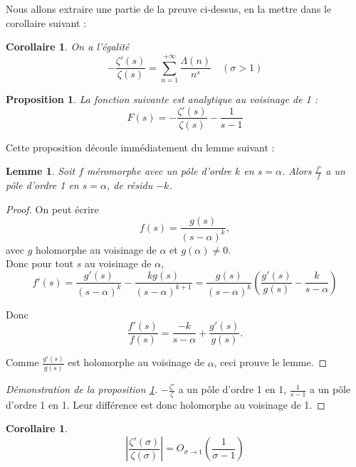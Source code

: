 \documentclass[french]{report}
\newtheorem{proposition}[theorem]{Proposition}
\newtheorem{corollary}[theorem]{Corollaire}
\newtheorem{lemma}[theorem]{Lemme}
\begin{document}
Nous allons extraire une partie de la preuve ci-dessus, en la mettre dans le corollaire suivant :

\begin{corollary}\label{cor:zeta-zeta-prime-van-mangoldt}
  On a l'égalité
  \[ -\frac{\zeta'(s)}{\zeta(s)} = \sum_{n=1}^{+\infty}\frac{\Lambda(n)}{n^s}\quad(\sigma>1) \]
\end{corollary}

\begin{proposition}\label{prop:zeta-sur-zeta-prime-1-sur-holomorphe}
  La fonction suivante est analytique au voisinage de 1 :
  \[ F(s) = - \frac{\zeta'(s)}{\zeta(s)} - \frac{1}{s-1} \]
\end{proposition}

Cette proposition découle immédiatement du lemme suivant :

\begin{lemma}
  Soit $f$ méromorphe avec un pôle d'ordre $k$ en $s=\alpha$. Alors $\frac{f'}{f}$ a un pôle d'ordre 1 en $s=\alpha$, de résidu $-k$.
\end{lemma}

\begin{proof}
  On peut écrire
  \[ f(s) = \frac{g(s)}{(s-\alpha)^k},\]
  avec $g$ holomorphe au voisinage de $\alpha$ et $g(\alpha)\neq0$.
  \\

  Donc pour tout $s$ au voisinage de $\alpha$,
  \[
    f'(s)
    = \frac{g'(s)}{(s-\alpha)^k}-\frac{kg(s)}{(s-\alpha)^{k+1}}
    = \frac{g(s)}{(s-\alpha)^k}\left(\frac{g'(s)}{g(s)}-\frac{k}{s-\alpha}\right)
  \]

  Donc
  \[
    \frac{f'(s)}{f(s)} = \frac{-k}{s-\alpha}+\frac{g'(s)}{g(s)}.
  \]

  Comme $\frac{g'(s)}{g(s)}$ est holomorphe au voisinage de $\alpha$, ceci prouve le lemme.
\end{proof}

\begin{proof}[Démonstration de la proposition \ref{prop:zeta-sur-zeta-prime-1-sur-holomorphe}]
 $-\frac{\zeta'}{\zeta}$ a un pôle d'ordre 1 en 1, $\frac{1}{s-1}$ a un pôle d'ordre 1 en 1. Leur différence est donc holomorphe au voisinage de 1.
\end{proof}

\begin{corollary}\label{cor:zeta-sur-zeta-prime-o}
  \[ \left|\frac{\zeta'(\sigma)}{\zeta(\sigma)}\right| = O_{\sigma\to1}\left(\frac{1}{\sigma-1}\right) \]
\end{corollary}
\end{document}
